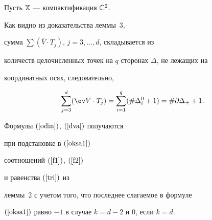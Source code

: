 Пусть $\Bbb X$ --- компактификация $\Bbb C^2$.


Как видно из доказательства леммы~3,


сумма $\sum (\overline{V}\cdot T_j)$, $j=3,\dotsc,d$, складывается из


количеств целочисленных точек на $q$ сторонах $\Delta$, не лежащих на


координатных осях, следовательно,


\begin{equation}


\label{f2}


\sum\limits_{j=3}^{d}(\ov V\cdot T_j) =


\sum\limits_{i=1}^{q}(\#\Delta^0_i +1)=\#\partial\Delta_+ +1.


\end{equation}





Формулы $(\ref{odin})$, $(\ref{dva})$ получаются


при подстановке в $(\ref{oksa1})$


соотношений $(\ref{f1})$, $(\ref{f2})$


и равенства $(\ref{tri})$ из


леммы~2 с учетом того, что последнее слагаемое в формуле


$(\ref{oksa1})$ равно $-1$ в случае $k=d-2$ и 0, если $k=d$.





